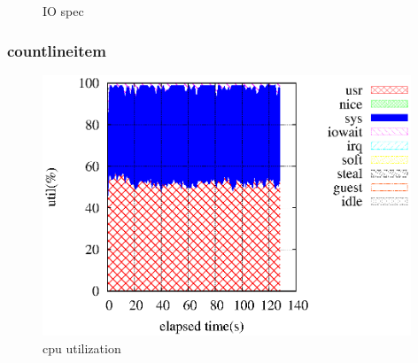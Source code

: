 \documentclass[11pt,a4paper]{jsarticle}
\newlength{\subfigwidth}
\newlength{\subfigcolsep}
\begin{document}
\begin{figure}[thbp]
 \setlength{\subfigwidth}{.5\linewidth}
 \addtolength{\subfigwidth}{-.5\subfigcolsep}
 \begin{minipage}[b]{\subfigwidth}
 \end{minipage}
  \begin{minipage}[b]{\subfigwidth}
  \end{minipage}
  \caption{IO spec}
  \label{fig:1}
\end{figure}

\clearpage
\subsubsection*{countlineitem}
\begin{figure}[thbp]
 \begin{center}
  \includegraphics[width=110mm]{countlineitemcore1.eps}
 \end{center}
 \caption{cpu utilization}
 \label{fig:3cpu}
\end{figure}
\end{document}
